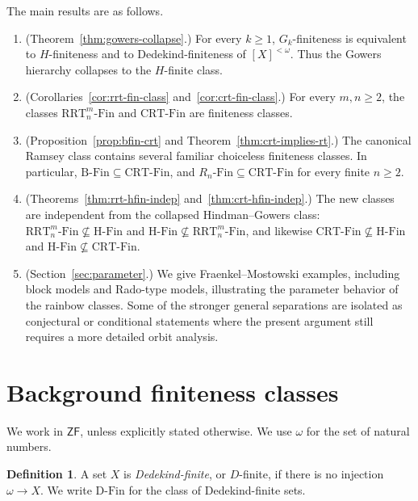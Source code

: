 \documentclass[11pt]{amsart}
\theoremstyle{definition}
\newtheorem{definition}[theorem]{Definition}
\newcommand{\ZF}{\mathsf{ZF}}
\newcommand{\DFin}{\mathrm{D\text{-}Fin}}
\newcommand{\BFin}{\mathrm{B\text{-}Fin}}
\newcommand{\HFin}{\mathrm{H\text{-}Fin}}
\newcommand{\RnFin}[1]{R_{#1}\text{-}\mathrm{Fin}}
\newcommand{\RRT}{\mathrm{RRT}}
\newcommand{\CRT}{\mathrm{CRT}}
\newcommand{\RRTFin}[2]{\RRT^{#1}_{#2}\text{-}\mathrm{Fin}}
\newcommand{\CRTFin}{\CRT\text{-}\mathrm{Fin}}
\begin{document}
The main results are as follows.

\begin{enumerate}[label=(\arabic*)]
    \item (Theorem~\ref{thm:gowers-collapse}.)  For every \(k\geq 1\), \(G_k\)-finiteness is equivalent to \(H\)-finiteness and to Dedekind-finiteness of \([X]^{<\omega}\).  Thus the Gowers hierarchy collapses to the \(H\)-finite class.

    \item (Corollaries~\ref{cor:rrt-fin-class} and~\ref{cor:crt-fin-class}.)  For every \(m,n\geq 2\), the classes \(\RRTFin{m}{n}\) and \(\CRTFin\) are finiteness classes.

    \item (Proposition~\ref{prop:bfin-crt} and Theorem~\ref{thm:crt-implies-rt}.)  The canonical Ramsey class contains several familiar choiceless finiteness classes.  In particular, \(\BFin\subseteq \CRTFin\), and \(\RnFin{n}\subseteq \CRTFin\) for every finite \(n\geq 2\).

    \item (Theorems~\ref{thm:rrt-hfin-indep} and~\ref{thm:crt-hfin-indep}.)  The new classes are independent from the collapsed Hindman--Gowers class: \(\RRTFin{m}{n}\not\subseteq \HFin\) and \(\HFin\not\subseteq \RRTFin{m}{n}\), and likewise \(\CRTFin\not\subseteq \HFin\) and \(\HFin\not\subseteq \CRTFin\).

    \item (Section~\ref{sec:parameter}.)  We give Fraenkel--Mostowski examples, including block models and Rado-type models, illustrating the parameter behavior of the rainbow classes.  Some of the stronger general separations are isolated as conjectural or conditional statements where the present argument still requires a more detailed orbit analysis.
\end{enumerate}

\section{Background finiteness classes}

We work in \(\ZF\), unless explicitly stated otherwise.  We use \(\omega\) for the set of natural numbers.

\begin{definition}
A set \(X\) is \emph{Dedekind-finite}, or \(D\)-finite, if there is no injection \(\omega\to X\).  We write \(\DFin\) for the class of Dedekind-finite sets.
\end{definition}
\end{document}
